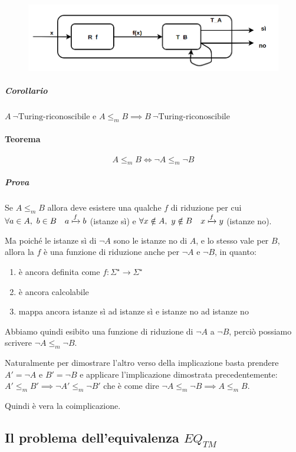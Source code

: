 \begin{figure}[H]
	\centering \includegraphics[scale=0.5]{teorema-1}
\end{figure}

\subparagraph{Corollario} $A \ \neg \text{Turing-riconoscibile e } A \leq_m B \implies B \ \neg \text{Turing-riconoscibile}$

\paragraph{Teorema}
\[
	A \leq_m B \iff \neg A \leq_m \neg B
\]
\subparagraph{Prova} Se $A \leq_m B$ allora deve esistere una qualche $f$ di riduzione per cui $\forall a \in A, \ b \in B \quad a \xmapsto{f} b$ (istanze sì) e $\forall x \notin A, \ y \notin B \quad x \xmapsto{f} y$ (istanze no).

Ma poiché le istanze sì di $\neg A$ sono le istanze no di $A$, e lo stesso vale per $B$, allora la $f$ è una funzione di riduzione anche per $\neg A$ e $\neg B$, in quanto:
\begin{enumerate}
 \item è ancora definita come $f: \Sigma^{\star} \to \Sigma^{\star}$
 \item è ancora calcolabile
 \item mappa ancora istanze sì ad istanze sì e istanze no ad istanze no
 \end{enumerate}
Abbiamo quindi esibito una funzione di riduzione di $\neg A$ a $\neg B$, perciò possiamo scrivere $\neg A \leq_m \neg B$.

Naturalmente per dimostrare l'altro verso della implicazione basta prendere $A' = \neg A$ e $B' = \neg B$ e applicare l'implicazione dimostrata precedentemente: \\
$A' \leq_m B' \implies \neg A' \leq_m \neg B'$ che è come dire $\neg A \leq_m \neg B \implies A \leq_m B$.

Quindi è vera la coimplicazione.

\subsection{Il problema dell'equivalenza $EQ_{TM}$}

